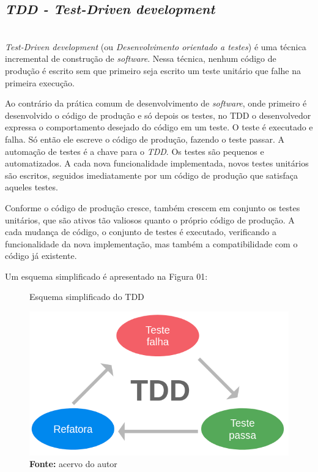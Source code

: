 \documentclass[times, twoside, watermark]{artigo}
\begin{document}
\subsection{\textit{TDD - Test-Driven development}}\hfill\\

\textit{Test-Driven development} (ou \textit{Desenvolvimento orientado a testes}) é uma técnica
incremental de construção de \textit{software}. 
Nessa técnica, nenhum código de produção é escrito sem que primeiro seja escrito um 
teste unitário que falhe na primeira execução. 

Ao contrário da prática comum de desenvolvimento de \textit{software}, onde primeiro é desenvolvido o
código de produção e só depois os testes, no TDD
o desenvolvedor expressa o comportamento desejado do código em um teste. 
O teste é executado e falha. Só então ele escreve o código de produção, fazendo o teste passar.
A automação de testes é a chave para o \textit{TDD}. Os testes são pequenos e automatizados.
A cada nova funcionalidade implementada, novos testes unitários são escritos, 
seguidos imediatamente por um código de produção que satisfaça aqueles testes. 

Conforme o código de produção cresce, também crescem em conjunto os testes unitários, 
que são ativos tão valiosos quanto o próprio código de produção. 
A cada mudança de código, o conjunto de testes é executado, verificando a funcionalidade da nova
implementação, mas também a compatibilidade com o código já existente\cite{tddembeddedc}.


Um esquema simplificado é apresentado na Figura 01:\hfill\

\begin{figure}[H]
    \centering
    \caption{Esquema simplificado do TDD}
    \includegraphics[width=0.95\linewidth]{images/tdd.png}
    \caption*{\newline\textbf{Fonte:} acervo do autor}
\end{figure}
\end{document}
